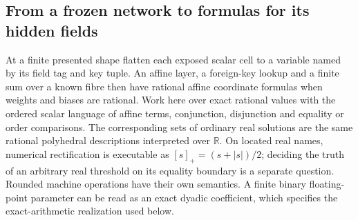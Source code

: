 \documentclass[11pt,a4paper]{article}
\theoremstyle{definition}
\theoremstyle{remark}\newaliascnt{remark}{theorem}
\numberwithin{equation}{section}
\begin{document}
\subsection{From a frozen network to formulas for its hidden fields}\label{sec:representation-readback}
At a finite presented shape flatten each exposed scalar cell to a variable named by its field tag and key tuple. An affine layer, a foreign-key lookup and a finite sum over a known fibre then have rational affine coordinate formulas when weights and biases are rational. Work here over exact rational values with the ordered scalar language of affine terms, conjunction, disjunction and equality or order comparisons. The corresponding sets of ordinary real solutions are the same rational polyhedral descriptions interpreted over $\mathbb R$. On located real names, numerical rectification is executable as $[s]_+=(s+|s|)/2$; deciding the truth of an arbitrary real threshold on its equality boundary is a separate question. Rounded machine operations have their own semantics. A finite binary floating-point parameter can be read as an exact dyadic coefficient, which specifies the exact-arithmetic realization used below.
\end{document}
